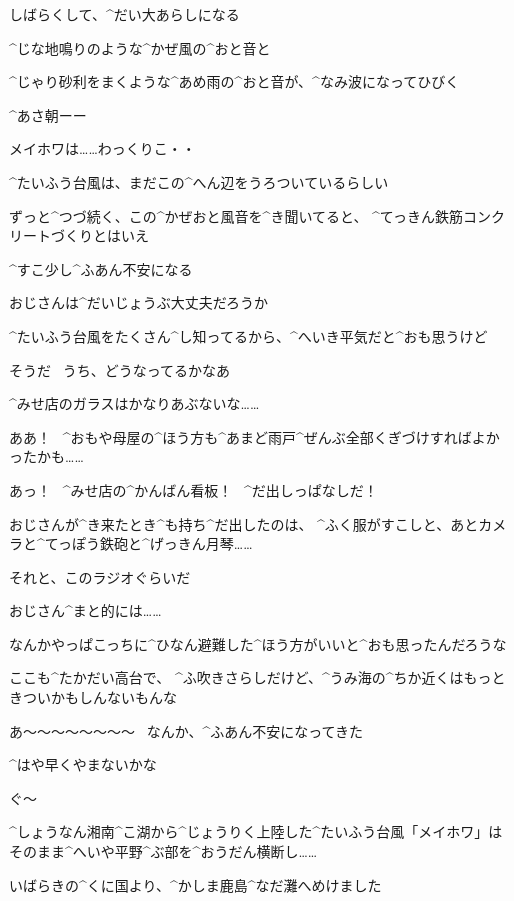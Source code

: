\Alpha しばらくして、^{だい}{大}あらしになる

\Alpha ^{じな}{地鳴}りのような^{かぜ}{風}の^{おと}{音}と

\Alpha ^{じゃり}{砂利}をまくような^{あめ}{雨}の^{おと}{音}が、^{なみ}{波}になってひびく

\page
\Alpha ^{あさ}{朝}ーー

\Person メイホワは……わっくりこ・・

\page
\Alpha ^{たいふう}{台風}は、まだこの^{へん}{辺}をうろついているらしい

\Alpha ずっと^{つづ}{続}く、この^{かぜおと}{風音}を^{き}{聞}いてると、
^{てっきん}{鉄筋}コンクリートづくりとはいえ

\Alpha ^{すこ}{少}し^{ふあん}{不安}になる

\Alpha おじさんは^{だいじょうぶ}{大丈夫}だろうか

\Alpha ^{たいふう}{台風}をたくさん^{し}{知}ってるから、^{へいき}{平気}だと^{おも}{思}うけど

\page
\Alpha そうだ
\ うち、どうなってるかなあ

\Alpha ^{みせ}{店}のガラスはかなりあぶないな……

\Alpha ああ！
\ ^{おもや}{母屋}の^{ほう}{方}も^{あまど}{雨戸}^{ぜんぶ}{全部}くぎづけすればよかったかも……

\Alpha あっ！
\ ^{みせ}{店}の^{かんばん}{看板}！
\ ^{だ}{出}しっぱなしだ！

\Alpha おじさんが^{き}{来}たとき^{も}{持}ち^{だ}{出}したのは、
^{ふく}{服}がすこしと、あとカメラと^{てっぽう}{鉄砲}と^{げっきん}{月琴}……

\Alpha それと、このラジオぐらいだ

\page
\Alpha おじさん^{まと}{的}には……

\Alpha なんかやっぱこっちに^{ひなん}{避難}した^{ほう}{方}がいいと^{おも}{思}ったんだろうな

\Alpha ここも^{たかだい}{高台}で、
^{ふ}{吹}きさらしだけど、^{うみ}{海}の^{ちか}{近}くはもっときついかもしんないもんな

\Alpha あ〜〜〜〜〜〜〜〜
\ なんか、^{ふあん}{不安}になってきた

\Alpha ^{はや}{早}くやまないかな

\Alpha ぐ〜

\page[108]
\Person ^{しょうなん}{湘南}^{こ}{湖}から^{じょうりく}{上陸}した^{たいふう}{台風}「メイホワ」は
そのまま^{へいや}{平野}^{ぶ}{部}を^{おうだん}{横断}し……

\Person いばらきの^{くに}{国}より、^{かしま}{鹿島}^{なだ}{灘}へめけました

